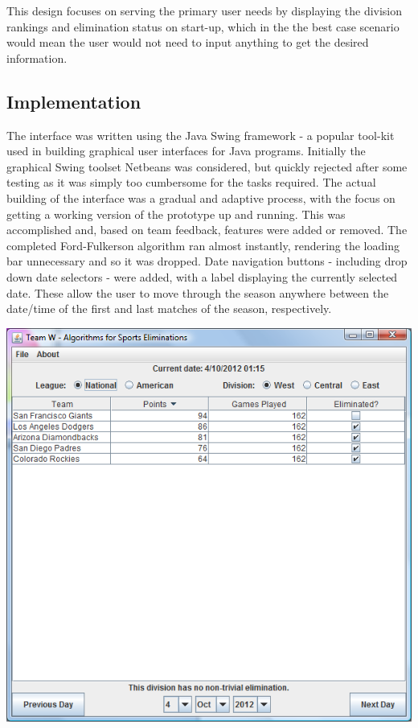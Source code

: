 This design focuses on serving the primary user needs by displaying the division
rankings and elimination status on start-up, which in the the best case scenario
would mean the user would not need to input anything to get the desired
information.

\subsection{Implementation}

The interface was written using the Java Swing framework - a popular tool-kit
used in building graphical user interfaces for Java programs. Initially the 
graphical Swing toolset Netbeans was considered, but quickly rejected after some
testing as it was simply too cumbersome for the tasks required.  The actual
building of the interface was a gradual and adaptive process, with the focus on
getting a working version of the  prototype up and running. This was
accomplished and, based on team feedback, features were added or removed. The
completed Ford-Fulkerson algorithm ran almost instantly, rendering the loading
bar unnecessary and so it was dropped. Date navigation buttons - including drop
down date selectors - were added, with a label displaying the currently selected
date. These  allow the user to move through the season anywhere between the
date/time of  the first and last matches of the season, respectively.

\includegraphics[width=0.9\linewidth,keepaspectratio]
{images/finalDesktopUI.png}

